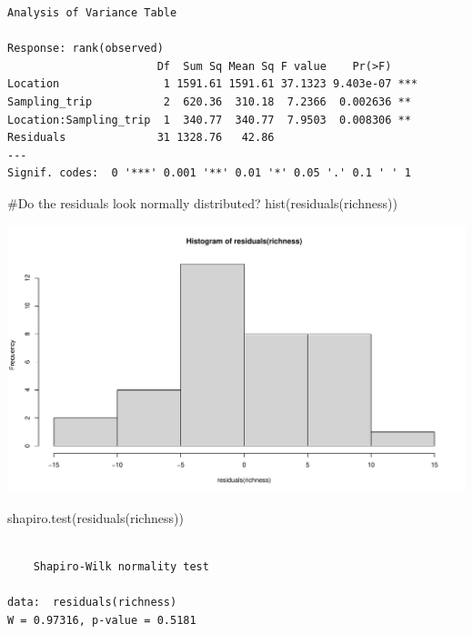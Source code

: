 \documentclass[
  letterpaper,
  DIV=11,
  numbers=noendperiod]{scrartcl}
\newenvironment{Shaded}{\begin{snugshade}}{\end{snugshade}}
\newcommand{\CommentTok}[1]{\textcolor[rgb]{0.37,0.37,0.37}{#1}}
\newcommand{\FunctionTok}[1]{\textcolor[rgb]{0.28,0.35,0.67}{#1}}
\newcommand{\NormalTok}[1]{\textcolor[rgb]{0.00,0.23,0.31}{#1}}
\begin{document}
\begin{verbatim}
Analysis of Variance Table

Response: rank(observed)
                       Df  Sum Sq Mean Sq F value    Pr(>F)    
Location                1 1591.61 1591.61 37.1323 9.403e-07 ***
Sampling_trip           2  620.36  310.18  7.2366  0.002636 ** 
Location:Sampling_trip  1  340.77  340.77  7.9503  0.008306 ** 
Residuals              31 1328.76   42.86                      
---
Signif. codes:  0 '***' 0.001 '**' 0.01 '*' 0.05 '.' 0.1 ' ' 1
\end{verbatim}

\begin{Shaded}
\begin{Highlighting}[]
\CommentTok{\#Do the residuals look normally distributed?}
\FunctionTok{hist}\NormalTok{(}\FunctionTok{residuals}\NormalTok{(richness))}
\end{Highlighting}
\end{Shaded}

\includegraphics{code_files/figure-pdf/unnamed-chunk-4-2.pdf}

\begin{Shaded}
\begin{Highlighting}[]
\FunctionTok{shapiro.test}\NormalTok{(}\FunctionTok{residuals}\NormalTok{(richness))}
\end{Highlighting}
\end{Shaded}

\begin{verbatim}

    Shapiro-Wilk normality test

data:  residuals(richness)
W = 0.97316, p-value = 0.5181
\end{verbatim}
\end{document}
